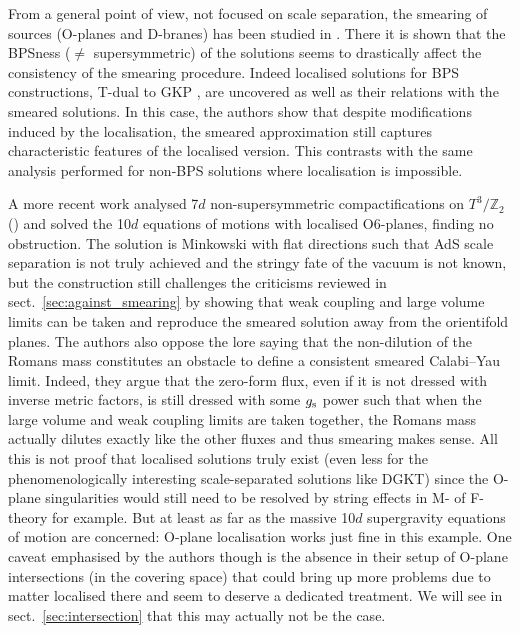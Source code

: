 \documentclass[11pt, a4paper]{article}
\newcommand{\Z}{\mathbb{Z}}
\begin{document}
From a general point of view, not focused on scale separation, the smearing of sources (O-planes and D-branes) has been studied in \cite{Blaback:2010sj}. There it is shown that the BPSness ($\neq$ supersymmetric) of the solutions seems to drastically affect the consistency of the smearing procedure. Indeed localised solutions for BPS constructions, T-dual to GKP \cite{Giddings:2001yu}, are uncovered as well as their relations with the smeared solutions. In this case, the authors show that despite modifications induced by the localisation, the smeared approximation still captures characteristic features of the localised version. This contrasts with the same analysis performed for non-BPS solutions where localisation is impossible.

A more recent work \cite{Baines:2020dmu} analysed 7$d$ non-supersymmetric compactifications on $T^3/\Z_2$ (\cite{Blaback:2013taa}) and solved the 10$d$ equations of motions with localised O6-planes, finding no obstruction. The solution is Minkowski with flat directions such that AdS scale separation is not truly achieved and the stringy fate of the vacuum is not known, but the construction still challenges the criticisms reviewed in sect.~\ref{sec:against_smearing} by showing that weak coupling and large volume limits can be taken and reproduce the smeared solution away from the orientifold planes. The authors also oppose the lore saying that the non-dilution of the Romans mass constitutes an obstacle to define a consistent smeared Calabi--Yau limit. Indeed, they argue that the zero-form flux, even if it is not dressed with inverse metric factors, is still dressed with some $g_{\rm s}$ power such that when the large volume and weak coupling limits are taken together, the Romans mass actually dilutes exactly like the other fluxes and thus smearing makes sense. All this is not proof that localised solutions truly exist (even less for the phenomenologically interesting scale-separated solutions like DGKT) since the O-plane singularities would still need to be resolved by string effects in M- of F-theory for example. But at least as far as the massive 10$d$ supergravity equations of motion are concerned: O-plane localisation works just fine in this example. One caveat emphasised by the authors though is the absence in their setup of O-plane intersections (in the covering space) that could bring up more problems due to matter localised there and seem to deserve a dedicated treatment. We will see in sect.~\ref{sec:intersection} that this may actually not be the case.\\
\end{document}
